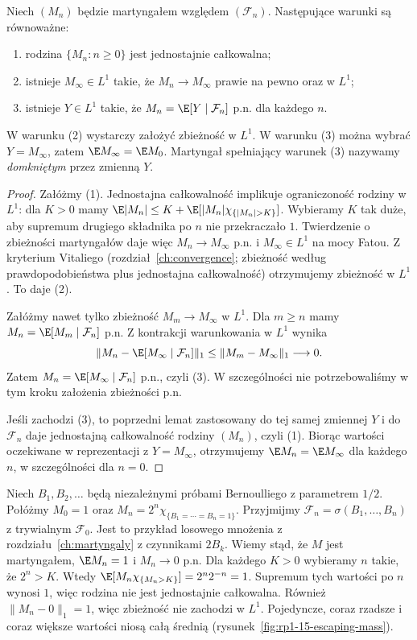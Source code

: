 \begin{twierdzenie}
\label{thm:rp1-15-ui-martingale}
Niech $(M_n)$ będzie martyngałem względem
$(\mathcal F_n)$. Następujące warunki są równoważne:
\begin{enumerate}
\item rodzina $\{M_n:n\geq0\}$ jest jednostajnie całkowalna;
\item istnieje $M_\infty\in L^1$ takie, że
$M_n\to M_\infty$ prawie na pewno oraz w $L^1$;
\item istnieje $Y\in L^1$ takie, że
$M_n=\E[Y\mid\mathcal F_n]$ p.n. dla każdego $n$.
\end{enumerate}
W warunku (2) wystarczy założyć zbieżność
w $L^1$. W warunku (3) można wybrać
$Y=M_\infty$, zatem $\E M_\infty=\E M_0$.
Martyngał spełniający warunek (3) nazywamy
\emph{domkniętym} przez zmienną $Y$.
\end{twierdzenie}
\begin{proof}
Załóżmy (1). Jednostajna całkowalność implikuje
ograniczoność rodziny w $L^1$:
dla $K>0$ mamy
$\E|M_n|\leq K+\E[|M_n|\chi_{\{|M_n|>K\}}]$.
Wybieramy $K$ tak duże, aby supremum drugiego
składnika po $n$ nie przekraczało $1$.
Twierdzenie o zbieżności martyngałów daje więc
$M_n\to M_\infty$ p.n. i $M_\infty\in L^1$
na mocy Fatou. Z kryterium Vitaliego (rozdział~\ref{ch:convergence};
zbieżność według prawdopodobieństwa plus
jednostajna całkowalność) otrzymujemy zbieżność
w $L^1$. To daje (2).

Załóżmy nawet tylko zbieżność $M_m\to M_\infty$
w $L^1$. Dla $m\geq n$ mamy
$M_n=\E[M_m\mid\mathcal F_n]$ p.n.
Z kontrakcji warunkowania w $L^1$ wynika
\[
\|M_n-\E[M_\infty\mid\mathcal F_n]\|_1
\leq\|M_m-M_\infty\|_1\longrightarrow0.
\]
Zatem $M_n=\E[M_\infty\mid\mathcal F_n]$ p.n.,
czyli (3). W szczególności nie potrzebowaliśmy
w tym kroku założenia zbieżności p.n.

Jeśli zachodzi (3), to poprzedni lemat
zastosowany do tej samej zmiennej $Y$
i do $\mathcal F_n$ daje jednostajną całkowalność
rodziny $(M_n)$, czyli (1).
Biorąc wartości oczekiwane w reprezentacji
z $Y=M_\infty$, otrzymujemy $\E M_n=\E M_\infty$
dla każdego $n$, w szczególności dla $n=0$.
\end{proof}

\begin{przyklad}
Niech $B_1,B_2,\ldots$ będą niezależnymi
próbami Bernoulliego z parametrem $1/2$.
Połóżmy
$M_0=1$ oraz
$M_n=2^n\chi_{\{B_1=\cdots=B_n=1\}}$.
Przyjmijmy $\mathcal F_n=\sigma(B_1,\ldots,B_n)$
z trywialnym $\mathcal F_0$. Jest to przykład
losowego mnożenia z rozdziału~\ref{ch:martyngaly}
z czynnikami $2B_k$. Wiemy stąd, że $M$ jest
martyngałem, $\E M_n=1$ i $M_n\to0$ p.n.
Dla każdego $K>0$ wybieramy $n$ takie,
że $2^n>K$. Wtedy
$\E[M_n\chi_{\{M_n>K\}}]=2^n2^{-n}=1$.
Supremum tych wartości po $n$ wynosi $1$,
więc rodzina nie jest jednostajnie całkowalna.
Również $\|M_n-0\|_1=1$, więc zbieżność
nie zachodzi w $L^1$. Pojedyncze, coraz rzadsze
i coraz większe wartości niosą całą średnią
(rysunek~\ref{fig:rp1-15-escaping-mass}).
\end{przyklad}

